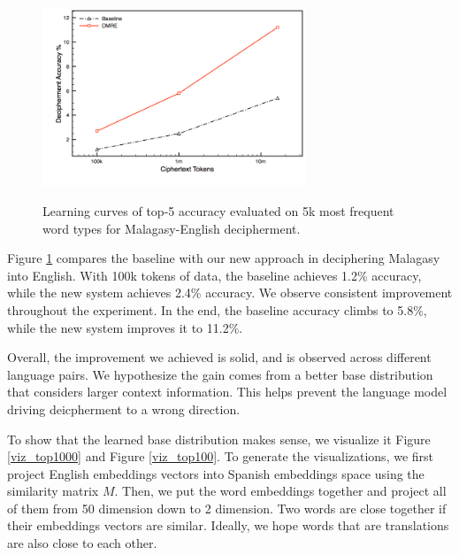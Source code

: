  \begin{figure}[!ht]
  \centering
  \includegraphics[width=3.1in,height=2.4in]{mlg_en_curve}
  \caption{Learning curves of top-5 accuracy evaluated on 5k most frequent word types for Malagasy-English decipherment.}
\label{mlg-en-curve}
\end{figure}

Figure \ref{mlg-en-curve} compares the baseline with our new approach in deciphering Malagasy into English. With 100k tokens of data, the baseline achieves 1.2\% accuracy, while the new system achieves 2.4\% accuracy.  We observe consistent improvement throughout the experiment. In the end, the baseline accuracy climbs to 5.8\%, while the new system improves it to 11.2\%.

Overall, the improvement we achieved is solid, and is observed across different language pairs. We hypothesize the gain comes from a better base distribution that considers larger context information. This helps prevent the language model driving deicpherment to a wrong direction. 

To show that the learned base distribution makes sense, we visualize it Figure \ref{viz_top1000} and Figure \ref{viz_top100}. To generate the visualizations, we first project English embeddings vectors into Spanish embeddings space using the similarity matrix $M$. Then, we put the word embeddings together and project all of them from 50 dimension down to 2 dimension. Two words are close together if their embeddings vectors are similar. Ideally, we hope words that are translations are also close to each other.

